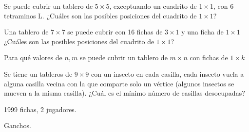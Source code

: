 
\begin{problema}
Se puede cubrir un tablero de $5\times 5$, exceptuando un cuadrito de $1\times 1$, con $6$ tetraminos L.
¿Cuáles son las posibles posiciones del cuadrito de $1\times 1$?
\end{problema}

\begin{problema}
Una tablero de $7\times 7$ se puede cubrir con 16 fichas de $3\times 1$ y una ficha de $1\times 1$
¿Cuáles son las posibles posiciones del cuadrito de $1\times 1$?
\end{problema}

\begin{problema}
Para qué valores de $n, m$ se puede cubrir un tablero de $m\times n$ con fichas de $1\times k$
\end{problema}

\begin{problema}
Se tiene un tableros de $9\times 9$ con un insecto en cada casilla, cada insecto vuela a alguna casilla vecina con la que comparte solo un vértice (algunos insectos se mueven a la misma casilla). ¿Cuál es el mínimo número de casillas desocupadas?
\end{problema}

\begin{problema}
[OMM]
1999 fichas, 2 jugadores.
\end{problema}

\begin{problema}
[IMO]
Ganchos.
\end{problema}

